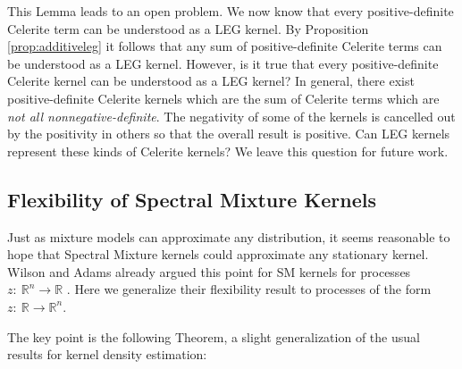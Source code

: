 \documentclass{article}
\theoremstyle{definition}
\begin{document}
This Lemma leads to an open problem.  We now know that every positive-definite Celerite term can be understood as a LEG kernel.  By Proposition \ref{prop:additiveleg} it follows that any sum of positive-definite Celerite terms can be understood as a LEG kernel.  However, is it true that every positive-definite Celerite kernel can be understood as a LEG kernel?  In general, there exist positive-definite Celerite kernels which are the sum of Celerite terms which are \emph{not all nonnegative-definite}.  The negativity of some of the kernels is cancelled out by the positivity in others so that the overall result is positive.  Can LEG kernels represent these kinds of Celerite kernels?  We leave this question for future work.

                                                           


\subsection{Flexibility of Spectral Mixture Kernels}

Just as mixture models can approximate any distribution, it seems reasonable to hope that Spectral Mixture kernels could approximate any stationary kernel.  Wilson and Adams already argued this point for SM kernels for processes $z:\ \mathbb{R}^n\rightarrow \mathbb{R}$ \cite{wilson2013gaussian}.  Here we generalize their flexibility result to processes of the form $z:\ \mathbb{R}\rightarrow \mathbb{R}^n$.

The key point is the following Theorem, a slight generalization of the usual results for kernel density estimation:
\end{document}
